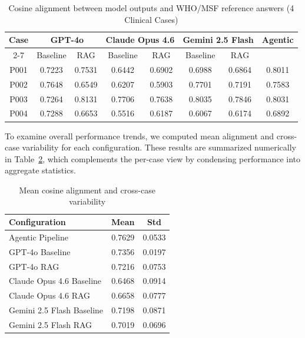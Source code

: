 \documentclass[preprint,12pt]{elsarticle}
\begin{document}
\begin{table}[!ht]
\centering
\caption{Cosine alignment between model outputs and WHO/MSF reference answers (4 Clinical Cases)}
\label{tab:alignment_scores_structured}
\renewcommand{\arraystretch}{1.2}
\small
\begin{tabular}{|c|cc|cc|cc|c|}
\hline
\textbf{Case} 
& \multicolumn{2}{c|}{\textbf{GPT-4o}} 
& \multicolumn{2}{c|}{\textbf{Claude Opus 4.6}} 
& \multicolumn{2}{c|}{\textbf{Gemini 2.5 Flash}} 
& \textbf{Agentic} \\
\cline{2-7}
& Baseline & RAG & Baseline & RAG & Baseline & RAG &  \\
\hline
P001 & 0.7223 & 0.7531 & 0.6442 & 0.6902 & 0.6988 & 0.6864 & 0.8011 \\
P002 & 0.7648 & 0.6549 & 0.6207 & 0.5903 & 0.7701 & 0.7191 & 0.7583 \\
P003 & 0.7264 & 0.8131 & 0.7706 & 0.7638 & 0.8035 & 0.7846 & 0.8031 \\
P004 & 0.7288 & 0.6653 & 0.5516 & 0.6187 & 0.6067 & 0.6174 & 0.6892 \\
\hline
\end{tabular}
\end{table}

To examine overall performance trends, we computed mean alignment and cross-case variability for each configuration. These results are summarized numerically in Table~\ref{tab:alignment_summary_structured}, which complements the per-case view by condensing performance into aggregate statistics.

\begin{table}[!ht]
\centering
\caption{Mean cosine alignment and cross-case variability}
\label{tab:alignment_summary_structured}
\renewcommand{\arraystretch}{1.2}
\small
\begin{tabular}{|l|c|c|}
\hline
\textbf{Configuration} & \textbf{Mean} & \textbf{Std} \\
\hline
Agentic Pipeline & 0.7629 & 0.0533 \\
GPT-4o Baseline & 0.7356 & 0.0197 \\
GPT-4o RAG & 0.7216 & 0.0753 \\
Claude Opus 4.6 Baseline & 0.6468 & 0.0914 \\
Claude Opus 4.6 RAG & 0.6658 & 0.0777 \\
Gemini 2.5 Flash Baseline & 0.7198 & 0.0871 \\
Gemini 2.5 Flash RAG & 0.7019 & 0.0696 \\
\hline
\end{tabular}
\end{table}
\end{document}
